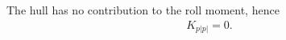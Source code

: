 

The hull has no contribution to the roll moment, hence 
\begin{align}
K_{p|p|}=0.
\end{align}
   
